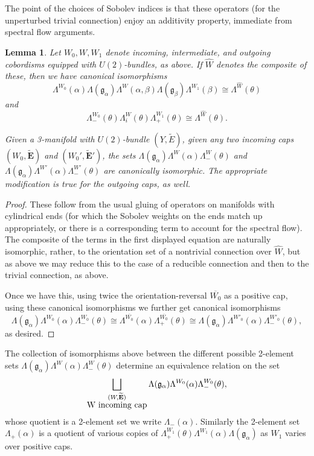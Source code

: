 \documentclass{memo-l}
\newtheorem{lemma}[theorem]{Lemma}
\theoremstyle{definition}
\theoremstyle{remark}
\numberwithin{section}{chapter}
\numberwithin{equation}{chapter}
\begin{document}
The point of the choices of Sobolev indices is that these operators (for the unperturbed trivial connection) enjoy an additivity property, immediate from spectral flow arguments.

\begin{lemma}Let $W_0, W, W_1$ denote incoming, intermediate, and outgoing cobordisms equipped with $U(2)$-bundles, as above. If $\hat W$ denotes the composite of these, then we have canonical isomorphisms $$\Lambda^{W_0}(\alpha) \Lambda(\mathfrak g_\alpha) \Lambda^W(\alpha, \beta) \Lambda(\mathfrak g_\beta) \Lambda^{W_1}(\beta) \cong \Lambda^{\hat W}(\theta)$$ and $$\Lambda^{W_0}_-(\theta) \Lambda^W_i(\theta) \Lambda^{W_1}_+(\theta) \cong \Lambda^{\hat W}(\theta).$$

Given a 3-manifold with $U(2)$-bundle $(Y, \tilde E)$, given any two incoming caps $(W_0, \widetilde{\mathbf{E}})$ and $(W_0', \widetilde{\mathbf{E}}')$, the sets $\Lambda(\mathfrak g_\alpha) \Lambda^W(\alpha) \Lambda^W_-(\theta)$ and $\Lambda(\mathfrak g_\alpha) \Lambda^{W'}(\alpha) \Lambda^{W'}_-(\theta)$ are canonically isomorphic. The appropriate modification is true for the outgoing caps, as well.
\end{lemma}
\begin{proof}These follow from the usual gluing of operators on manifolds with cylindrical ends (for which the Sobolev weights on the ends match up appropriately, or there is a corresponding term to account for the spectral flow). The composite of the terms in the first displayed equation are naturally isomorphic, rather, to the orientation set of a nontrivial connection over $\hat W$, but as above we may reduce this to the case of a reducible connection and then to the trivial connection, as above.

Once we have this, using twice the orientation-reversal $\overline{W_0}$ as a positive cap, using these canonical isomorphisms we further get canonical isomorphisms $$\Lambda(\mathfrak g_\alpha) \Lambda^{W_0}(\alpha) \Lambda^{W_0}_-(\theta) \cong \Lambda^{\overline{W_0}}(\alpha)  \Lambda^{\overline{W_0}}_+(\theta) \cong \Lambda(\mathfrak g_\alpha) \Lambda^{W'_0}(\alpha) \Lambda^{W'_0}_-(\theta),$$ as desired.
\end{proof}

The collection of isomorphisms above between the different possible 2-element sets $\Lambda(\mathfrak g_\alpha) \Lambda^W(\alpha) \Lambda^W_-(\theta)$ determine an equivalence relation on the set $$\bigsqcup_{\substack{(W, \widetilde{\mathbf{E}})\\ $W$ \text{ incoming cap}}} \Lambda(\mathfrak g_\alpha) \Lambda^{W_0}(\alpha) \Lambda^{W_0}_-(\theta),$$ whose quotient is a 2-element set we write $\Lambda_-(\alpha)$. Similarly the 2-element set $\Lambda_+(\alpha)$ is a quotient of various copies of $\Lambda^{W_1}_+(\theta)\Lambda^{W_1}(\alpha)\Lambda(\mathfrak g_\alpha)$ as $W_1$ varies over positive caps.
\end{document}
